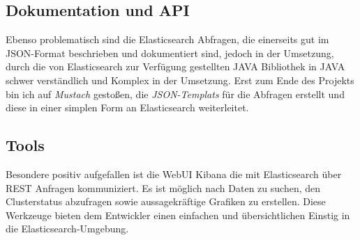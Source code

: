 \subsection{Dokumentation und API}
Ebenso problematisch sind die Elasticsearch Abfragen, die einerseits gut im JSON-Format beschrieben und dokumentiert sind, jedoch in der Umsetzung, durch die von Elasticsearch zur Verfügung gestellten JAVA Bibliothek in JAVA schwer verständlich und Komplex in der Umsetzung.
Erst zum Ende des Projekts bin ich auf \textit{Mustach} gestoßen, die \textit{JSON-Templats} für die Abfragen erstellt und diese in einer simplen Form an Elasticsearch weiterleitet.  

\subsection{Tools}
Besondere positiv aufgefallen ist die WebUI Kibana die mit Elasticsearch über REST Anfragen kommuniziert. Es ist möglich nach Daten zu suchen, den Clusterstatus abzufragen sowie aussagekräftige Grafiken zu erstellen. Diese Werkzeuge bieten dem Entwickler einen einfachen und übersichtlichen Einstig in die Elasticsearch-Umgebung.    

